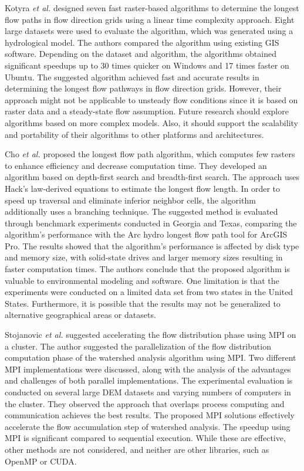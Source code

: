 \documentclass[journal, a4paper]{IEEEtran}
\begin{document}
	Kotyra \textit{et al.} \cite{KOTYRA2023105728} designed seven fast raster-based algorithms to determine the longest flow paths in flow direction grids using a linear time complexity approach. Eight large datasets were used to evaluate the algorithm, which was generated using a hydrological model. The authors compared the algorithm using existing GIS software. Depending on the dataset and algorithm, the algorithms obtained significant speedups up to 30 times quicker on Windows and 17 times faster on Ubuntu. The suggested algorithm achieved fast and accurate results in determining the longest flow pathways in flow direction grids. However, their approach might not be applicable to unsteady flow conditions since it is based on raster data and a steady-state flow assumption. Future research should explore algorithms based on more complex models. Also, it should support the scalability and portability of their algorithms to other platforms and architectures.

	Cho \textit{et al.} \cite{CHO2020104774} proposed the longest flow path algorithm, which computes few rasters to enhance efficiency and decrease computation time. They developed an algorithm based on depth-first search and breadth-first search. The approach uses Hack's law-derived equations to estimate the longest flow length. In order to speed up traversal and eliminate inferior neighbor cells, the algorithm additionally uses a branching technique. The suggested method is evaluated through benchmark experiments conducted in Georgia and Texas, comparing the algorithm's performance with the Arc hydro longest flow path tool for ArcGIS Pro. The results showed that the algorithm's performance is affected by disk type and memory size, with solid-state drives and larger memory sizes resulting in faster computation times. The authors conclude that the proposed algorithm is valuable to environmental modeling and software. One limitation is that the experiments were conducted on a limited data set from two states in the United States. Furthermore, it is possible that the results may not be generalized to alternative geographical areas or datasets.  

	Stojanovic \textit{et al.} \cite{stojanovic2020accelerating} suggested accelerating the flow distribution phase using MPI on a cluster. The author suggested the parallelization of the flow distribution computation phase of the watershed analysis algorithm using MPI. Two different MPI implementations were discussed, along with the analysis of the advantages and challenges of both parallel implementations. The experimental evaluation is conducted on several large DEM datasets and varying numbers of computers in the cluster. They observed the approach that overlaps process computing and communication achieves the best results. The proposed MPI solutions effectively accelerate the flow accumulation step of watershed analysis. The speedup using MPI is significant compared to sequential execution. While these are effective, other methods are not considered, and neither are other libraries, such as OpenMP or CUDA.
	
\end{document}
